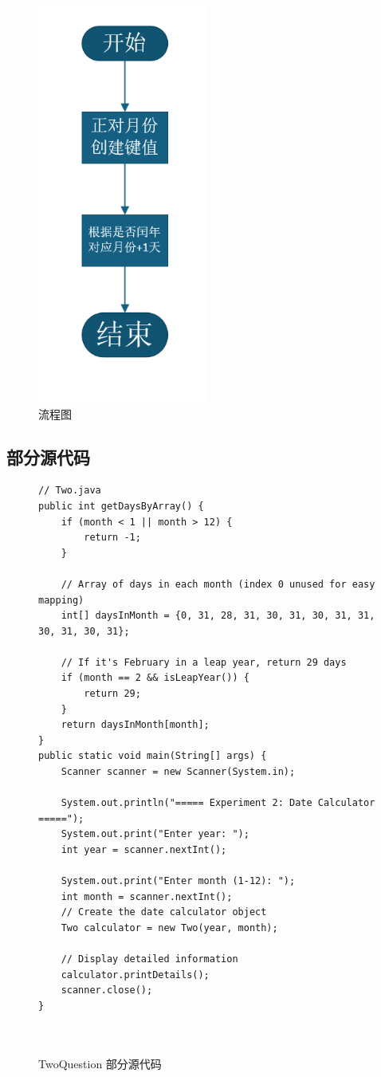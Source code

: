 \documentclass[12pt,a4paper]{article}
\begin{document}
\begin{figure}[H]
\centering
\includegraphics[width=0.5\textwidth]{two1.png}
\caption{流程图}
\end{figure}

\subsection*{部分源代码}
\begin{figure}[H]
\centering
\begin{lstlisting}
// Two.java
public int getDaysByArray() {
    if (month < 1 || month > 12) {
        return -1;
    }
        
    // Array of days in each month (index 0 unused for easy mapping)
    int[] daysInMonth = {0, 31, 28, 31, 30, 31, 30, 31, 31, 30, 31, 30, 31};
        
    // If it's February in a leap year, return 29 days
    if (month == 2 && isLeapYear()) {
        return 29;
    } 
    return daysInMonth[month];
}
public static void main(String[] args) {
    Scanner scanner = new Scanner(System.in);
        
    System.out.println("===== Experiment 2: Date Calculator =====");
    System.out.print("Enter year: ");
    int year = scanner.nextInt();
        
    System.out.print("Enter month (1-12): ");
    int month = scanner.nextInt(); 
    // Create the date calculator object
    Two calculator = new Two(year, month);
        
    // Display detailed information
    calculator.printDetails(); 
    scanner.close();
}



\end{lstlisting}
\caption{TwoQuestion 部分源代码}
\end{figure}
\end{document}
